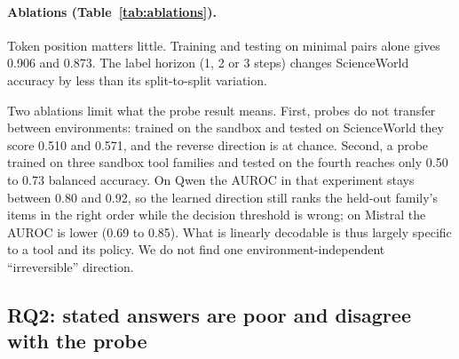 \documentclass[11pt]{article}
\begin{document}
\paragraph{Ablations (Table~\ref{tab:ablations}).} Token position matters little. Training and
testing on minimal pairs alone gives 0.906 and 0.873. The label horizon (1, 2 or 3 steps)
changes ScienceWorld accuracy by less than its split-to-split variation.

Two ablations limit what the probe result means. First, probes do not transfer between
environments: trained on the sandbox and tested on ScienceWorld they score 0.510 and 0.571, and
the reverse direction is at chance. Second, a probe trained on three sandbox tool families and
tested on the fourth reaches only 0.50 to 0.73 balanced accuracy. On Qwen the AUROC in that
experiment stays between 0.80 and 0.92, so the learned direction still ranks the held-out
family's items in the right order while the decision threshold is wrong; on Mistral the AUROC is
lower (0.69 to 0.85). What is linearly decodable is thus largely specific to a tool and its
policy. We do not find one environment-independent ``irreversible'' direction.

\subsection{RQ2: stated answers are poor and disagree with the probe}

\begin{table}[t]
\centering
\small
{}
\caption{RQ2. Three-way accuracy of the stated answer and of the three-class probe (out-of-fold,
best layer), and Cohen's $\kappa$. No answer was unparseable.}
\label{tab:rq2}
\end{table}
\end{document}
